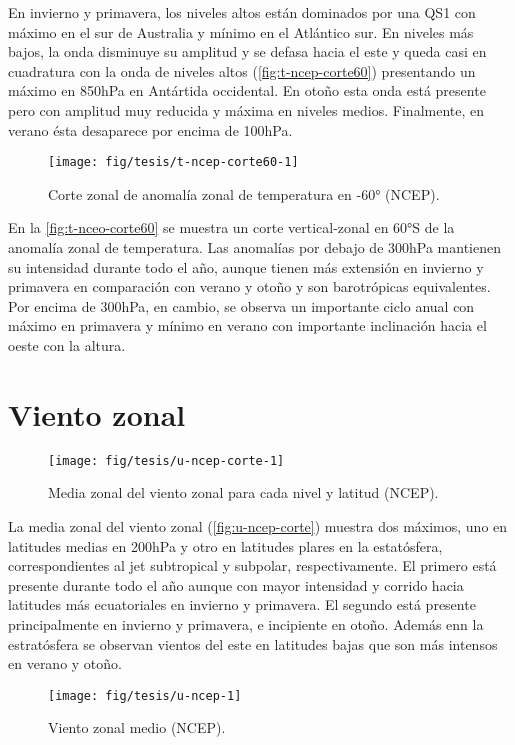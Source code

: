 \documentclass[spanish,a4paper,12pt]{book}
\begin{document}
En invierno y primavera, los niveles altos están dominados por una QS1
con máximo en el sur de Australia y mínimo en el Atlántico sur. En
niveles más bajos, la onda disminuye su amplitud y se defasa hacia el
este y queda casi en cuadratura con la onda de niveles altos
(\autoref{fig:t-ncep-corte60}) presentando un máximo en 850hPa en
Antártida occidental. En otoño esta onda está presente pero con amplitud
muy reducida y máxima en niveles medios. Finalmente, en verano ésta
desaparece por encima de 100hPa.

\begin{figure*}
\texttt{[image: fig/tesis/t-ncep-corte60-1]} \caption{Corte zonal de anomalía zonal de temperatura en -60° (NCEP).}\label{fig:t-ncep-corte60}
\end{figure*}

En la \autoref{fig:t-nceo-corte60} se muestra un corte vertical-zonal en
60°S de la anomalía zonal de temperatura. Las anomalías por debajo de
300hPa mantienen su intensidad durante todo el año, aunque tienen más
extensión en invierno y primavera en comparación con verano y otoño y
son barotrópicas equivalentes. Por encima de 300hPa, en cambio, se
observa un importante ciclo anual con máximo en primavera y mínimo en
verano con importante inclinación hacia el oeste con la altura.

\section{Viento zonal}\label{viento-zonal}

\begin{figure*}
\texttt{[image: fig/tesis/u-ncep-corte-1]} \caption{Media zonal del viento zonal para cada nivel y latitud (NCEP).}\label{fig:u-ncep-corte}
\end{figure*}

La media zonal del viento zonal (\autoref{fig:u-ncep-corte}) muestra dos
máximos, uno en latitudes medias en 200hPa y otro en latitudes plares en
la estatósfera, correspondientes al jet subtropical y subpolar,
respectivamente. El primero está presente durante todo el año aunque con
mayor intensidad y corrido hacia latitudes más ecuatoriales en invierno
y primavera. El segundo está presente principalmente en invierno y
primavera, e incipiente en otoño. Además enn la estratósfera se observan
vientos del este en latitudes bajas que son más intensos en verano y
otoño.

\begin{landscape}\begin{figure}

{\centering \texttt{[image: fig/tesis/u-ncep-1]} 

}

\caption{Viento zonal medio (NCEP).}\label{fig:u-ncep}
\end{figure}
\end{landscape}
\end{document}
